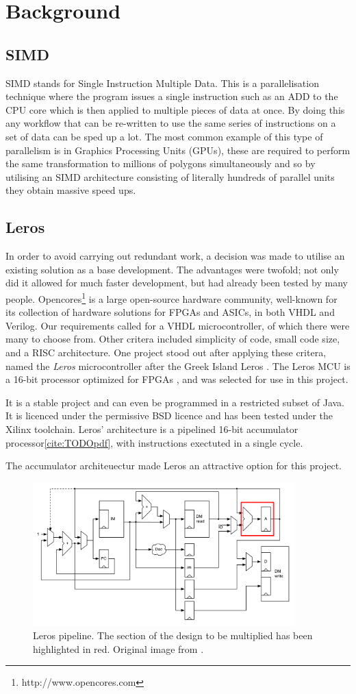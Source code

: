 \section{Background}
\subsection{SIMD}

SIMD stands for Single Instruction Multiple Data.  This is a parallelisation
technique where the program issues a single instruction such as an ADD to the
CPU core which is then applied to multiple pieces of data at once.  By doing
this any workflow that can be re-written to use the same series of instructions
on a set of data can be sped up a lot.  The most common example of this type of
parallelism is in Graphics Processing Units (GPUs), these are required to perform
the same transformation to millions of polygons simultaneously and so by
utilising an SIMD architecture consisting of literally hundreds of parallel
units they obtain massive speed ups.

\subsection{Leros}
In order to avoid carrying out redundant work, a decision was made to utilise an
existing solution as a base development. The advantages were twofold; not only
did it allowed for much faster development, but had already been tested by many
people. Opencores\footnote{
http://www.opencores.com
}
is a large open-source hardware community, well-known for its collection of hardware solutions for
FPGAs and ASICs, in both VHDL and Verilog. Our requirements called for a VHDL
microcontroller, of which there were many to choose from. Other critera included
simplicity of code, small code size, and a RISC architecture. One project stood out
after applying these critera, named the \emph{Leros} microcontroller after the
Greek Island Leros \cite{cite:TODO}.  The Leros MCU is a 16-bit
processor optimized for FPGAs \cite{cite:TODO}, and was selected for use in this
project.

 It is a stable
project and can even be programmed in a restricted subset of Java. It is licenced
under the permissive BSD licence and has been tested under the Xilinx toolchain.
Leros' architecture is a pipelined 16-bit accumulator processor\ref{cite:TODOpdf},
with instructions exectuted in a single cycle.

The accumulator architeuectur made Leros an attractive option for this project.

\begin{figure}[h]
\center
\includegraphics[width=0.9\textwidth]{images/leros-system}
\caption{Leros pipeline. The section of the design to be multiplied has been
highlighted in red. Original image from \cite{cite:TODO-pdf}.
}
\label{fig:leros-system}
\end{figure}

